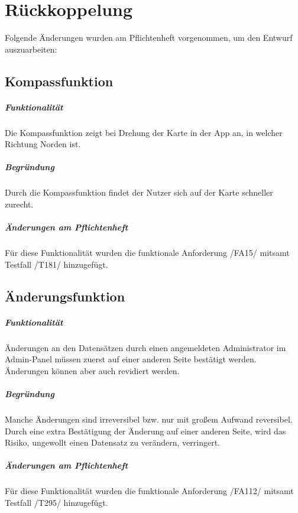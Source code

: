 \chapter{Rückkoppelung}
Folgende Änderungen wurden am Pflichtenheft vorgenommen, um den Entwurf auszuarbeiten:

\section*{Kompassfunktion}
\paragraph*{Funktionalität}
Die Kompassfunktion zeigt bei Drehung der Karte in der App an, in welcher Richtung Norden ist.

\paragraph*{Begründung}
Durch die Kompassfunktion findet der Nutzer sich auf der Karte schneller zurecht.

\paragraph*{Änderungen am Pflichtenheft}
Für diese Funktionalität wurden die funktionale Anforderung /FA15/ mitsamt Testfall /T181/ hinzugefügt.

\section*{Änderungsfunktion}
\paragraph*{Funktionalität}
Änderungen an den Datensätzen durch einen angemeldeten Administrator im Admin-Panel müssen zuerst auf einer anderen Seite bestätigt werden.
Änderungen können aber auch revidiert werden.

\paragraph*{Begründung}
Manche Änderungen sind irreversibel bzw. nur mit großem Aufwand reversibel. Durch eine extra Bestätigung der Änderung auf einer anderen Seite,
wird das Risiko, ungewollt einen Datensatz zu verändern, verringert.

\paragraph*{Änderungen am Pflichtenheft}
Für diese Funktionalität wurden die funktionale Anforderung /FA112/ mitsamt Testfall /T295/ hinzugefügt.